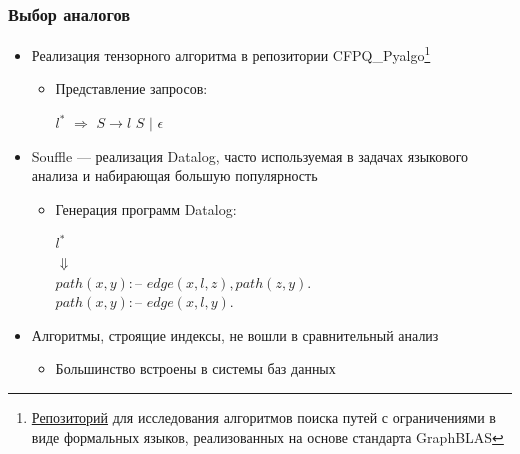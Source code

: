 \documentclass{beamer}
\begin{document}
\begin{frame}[fragile]
  \frametitle{Выбор аналогов}
  \begin{itemize}
    \item Реализация тензорного алгоритма в репозитории CFPQ\_Pyalgo\footnote{\href{https://github.com/bahbyega/CFPQ_PyAlgo}{Репозиторий} для исследования алгоритмов поиска путей с ограничениями в виде формальных языков, реализованных на основе стандарта GraphBLAS}
          \begin{itemize}
            \item Представление запросов:
                  \begin{center}
                    $l^*$ $\Rightarrow$ $S \rightarrow l$ $S$ $|$ $\epsilon$
                  \end{center}
          \end{itemize}
    \item Souffle --- реализация Datalog, часто используемая в задачах языкового анализа и набирающая большую популярность
          \begin{itemize}
            \item Генерация программ Datalog:
                  \begin{center}
                    $l^*$\\
                    $\Downarrow$\\
                    $path(x, y) :$-- $edge(x, l, z), path(z, y).$\\
                    $path(x, y) :$-- $edge(x, l, y).$
                  \end{center}
                  \vspace{5pt}
          \end{itemize}
    \item Алгоритмы, строящие индексы, не вошли в сравнительный анализ
          \begin{itemize}
            \item Большинство встроены в системы баз данных
          \end{itemize}
  \end{itemize}

\end{frame}
\end{document}
